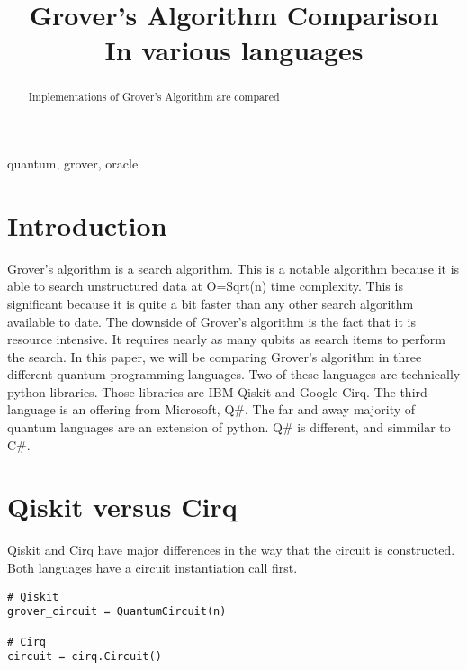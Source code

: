 \documentclass[conference]{IEEEtran}
\begin{document}
\title{ Grover's Algorithm Comparison \\
{\footnotesize In various languages}
}

\author{
}

\maketitle

\begin{abstract}
Implementations of Grover's Algorithm are compared
\end{abstract}

\begin{IEEEkeywords}
quantum, grover, oracle
\end{IEEEkeywords}

\section{Introduction}
Grover's algorithm is a search algorithm. 
This is a notable algorithm because it is able to search unstructured data at O=Sqrt(n) time complexity. 
This is significant because it is quite a bit faster than any other search algorithm available to date. 
The downside of Grover's algorithm is the fact that it is resource intensive. 
It requires nearly as many qubits as search items to perform the search. 
In this paper, we will be comparing Grover's algorithm in three different quantum programming languages. 
Two of these languages are technically python libraries. 
Those libraries are IBM Qiskit and Google Cirq. 
The third language is an offering from Microsoft, Q\#.
The far and away majority of quantum languages are an extension of python. 
Q\# is different, and simmilar to C\#. 

\section{Qiskit versus Cirq}
Qiskit and Cirq have major differences in the way that the circuit is constructed. 
Both languages have a circuit instantiation call first. 
\begin{verbatim}
# Qiskit
grover_circuit = QuantumCircuit(n)

# Cirq
circuit = cirq.Circuit()
\end{verbatim}
\end{document}
